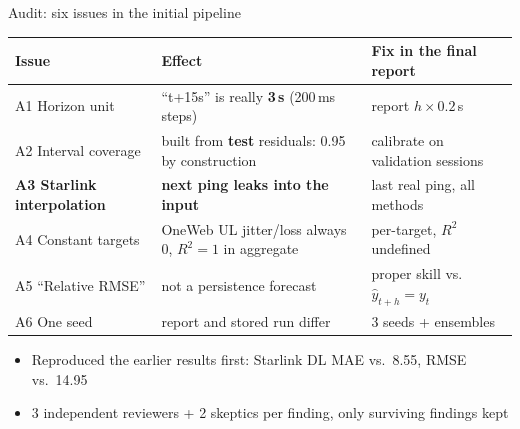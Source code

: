 \documentclass[aspectratio=169,11pt]{beamer}
\newcommand{\bad}[1]{\textcolor{High}{\textbf{#1}}}
\begin{document}
\begin{frame}{Audit: six issues in the initial pipeline}
  \footnotesize
  \begin{tabular}{p{3.2cm}p{6.3cm}p{4.6cm}}
  \toprule
  Issue & Effect & Fix in the final report \\
  \midrule
  A1 Horizon unit & ``t+15s'' is really \textbf{3\,s} (200\,ms steps) & report $h\times0.2$\,s \\
  A2 Interval coverage & built from \textbf{test} residuals: 0.95 by construction & calibrate on validation sessions \\
  \textbf{A3 Starlink interpolation} & \bad{next ping leaks into the input} & last real ping, all methods \\
  A4 Constant targets & OneWeb UL jitter/loss always 0, $R^2=1$ in aggregate & per-target, $R^2$ undefined \\
  A5 ``Relative RMSE'' & not a persistence forecast & proper skill vs.\ $\hat y_{t+h}=y_t$ \\
  A6 One seed & report and stored run differ & 3 seeds + ensembles \\
  \bottomrule
  \end{tabular}
  \vspace{0.3cm}
  \begin{itemize}\small
    \item Reproduced the earlier results first: Starlink DL MAE \ReproSLMAE{} vs.\ 8.55, RMSE \ReproSLRMSE{} vs.\ 14.95
    \item 3 independent reviewers + 2 skeptics per finding, only surviving findings kept
  \end{itemize}
\end{frame}
\end{document}
